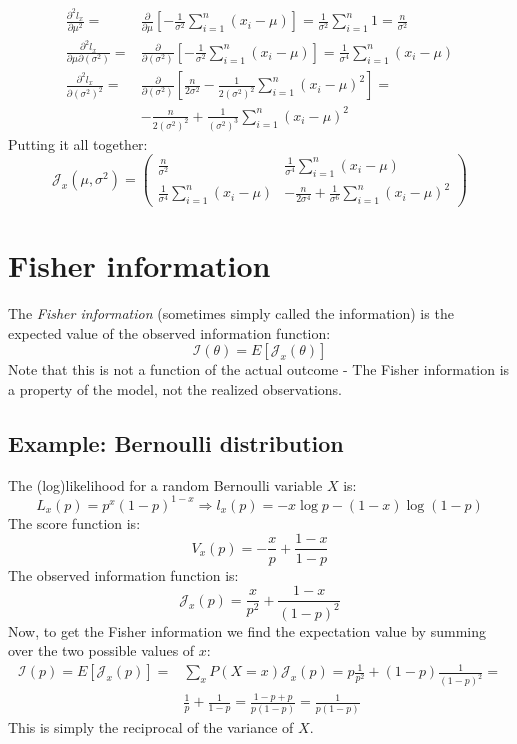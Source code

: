 \documentclass[12pt, a4paper]{article}
\numberwithin{equation}{section}
\begin{document}
\begin{align}
\frac{\partial^2 l_x}{\partial\mu^2}=&\frac{\partial}{\partial\mu}\left[-\frac{1}{\sigma^2}\sum_{i=1}^n(x_i-\mu)\right]=\frac{1}{\sigma^2}\sum_{i=1}^n1=\frac{n}{\sigma^2}\\
\frac{\partial^2 l_x}{\partial\mu\partial(\sigma^2)}=&\frac{\partial}{\partial(\sigma^2)}\left[-\frac{1}{\sigma^2}\sum_{i=1}^n(x_i-\mu)\right]=\frac{1}{\sigma^4}\sum_{i=1}^n(x_i-\mu) \\
\frac{\partial^2 l_x}{\partial(\sigma^2)^2}=&\frac{\partial}{\partial(\sigma^2)}\left[\frac{n}{2\sigma^2}-\frac{1}{2(\sigma^2)^2}\sum_{i=1}^n(x_i-\mu)^2\right]=\\
&-\frac{n}{2(\sigma^2)^2}+\frac{1}{(\sigma^2)^3}\sum_{i=1}^n(x_i-\mu)^2
\end{align}
Putting it all together:
\begin{equation}
\label{normal_observed_information}
\mathcal{J}_x(\mu,\sigma^2)=
\begin{pmatrix}
\frac{n}{\sigma^2} & \frac{1}{\sigma^4}\sum_{i=1}^n(x_i-\mu) \\
\frac{1}{\sigma^4}\sum_{i=1}^n(x_i-\mu) & -\frac{n}{2\sigma^4}+\frac{1}{\sigma^6}\sum_{i=1}^n(x_i-\mu)^2
\end{pmatrix}
\end{equation}

\section{Fisher information}
The \textit{Fisher information} (sometimes simply called the information) is the expected value of the observed information function:
\begin{equation}
\mathcal{I}(\theta)=E[\mathcal{J}_x(\theta)]
\end{equation}
Note that this is not a function of the actual outcome - The Fisher information is a property of the model, not the realized observations.

\subsection{Example: Bernoulli distribution}
The (log)likelihood for a random Bernoulli variable $X$ is:
\begin{equation}
L_x(p)=p^x(1-p)^{1-x}\Rightarrow l_x(p)=-x\log p-(1-x)\log(1-p)
\end{equation}
The score function is:
\begin{equation}
V_x(p)=-\frac{x}{p}+\frac{1-x}{1-p}
\end{equation}
The observed information function is:
\begin{equation}
\mathcal{J}_x(p)=\frac{x}{p^2}+\frac{1-x}{(1-p)^2}
\end{equation}
Now, to get the Fisher information we find the expectation value by summing over the two possible values of $x$:
\begin{align}
\mathcal{I}(p)=E[\mathcal{J}_x(p)]=&\sum_x P(X=x)\mathcal{J}_x(p)=p\frac{1}{p^2}+(1-p)\frac{1}{(1-p)^2}= \\
&\frac{1}{p}+\frac{1}{1-p}=\frac{1-p+p}{p(1-p)}=\frac{1}{p(1-p)}
\end{align}
This is simply the reciprocal of the variance of $X$.
\end{document}
